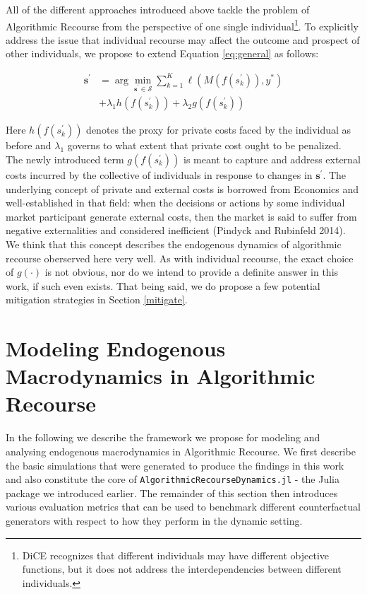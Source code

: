 \documentclass[conference,final,]{IEEEtran}
\begin{document}
All of the different approaches introduced above tackle the problem of Algorithmic Recourse from the perspective of one single individual\footnote{DiCE recognizes that different individuals may have different objective functions, but it does not address the interdependencies between different individuals.}. To explicitly address the issue that individual recourse may affect the outcome and prospect of other individuals, we propose to extend Equation \eqref{eq:general} as follows:

\begin{equation}
\begin{aligned}
\mathbf{s}^\prime &= \arg \min_{\mathbf{s}^\prime \in \mathcal{S}}  \sum_{k=1}^{K} {\ell(M(f(s_k^\prime)),y^*)} \\ &+ \lambda_1 {h(f(s_k^\prime)) } + \lambda_2 {g(f(s_k^\prime))}  \label{eq:collective}
\end{aligned} 
\end{equation}

Here \(h(f(s_k^\prime))\) denotes the proxy for private costs faced by the individual as before and \(\lambda_1\) governs to what extent that private cost ought to be penalized. The newly introduced term \(g(f(s_k^\prime))\) is meant to capture and address external costs incurred by the collective of individuals in response to changes in \(\mathbf{s}^\prime\). The underlying concept of private and external costs is borrowed from Economics and well-established in that field: when the decisions or actions by some individual market participant generate external costs, then the market is said to suffer from negative externalities and considered inefficient (Pindyck and Rubinfeld 2014). We think that this concept describes the endogenous dynamics of algorithmic recourse oberserved here very well. As with individual recourse, the exact choice of \(g(\cdot)\) is not obvious, nor do we intend to provide a definite answer in this work, if such even exists. That being said, we do propose a few potential mitigation strategies in Section \ref{mitigate}.

\hypertarget{method-2}{%
\section{Modeling Endogenous Macrodynamics in Algorithmic Recourse}\label{method-2}}

In the following we describe the framework we propose for modeling and analysing endogenous macrodynamics in Algorithmic Recourse. We first describe the basic simulations that were generated to produce the findings in this work and also constitute the core of \texttt{AlgorithmicRecourseDynamics.jl} - the Julia package we introduced earlier. The remainder of this section then introduces various evaluation metrics that can be used to benchmark different counterfactual generators with respect to how they perform in the dynamic setting.
\end{document}
